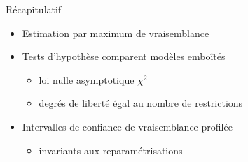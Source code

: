 \documentclass[
  ignorenonframetext,
]{beamer}
\providecommand{\tightlist}{%
  \setlength{\itemsep}{0pt}\setlength{\parskip}{0pt}}\usepackage{longtable,booktabs,array}
\begin{document}
\begin{frame}{Récapitulatif}
\protect\hypertarget{ruxe9capitulatif-2}{}
\begin{itemize}
\tightlist
\item
  Estimation par maximum de vraisemblance
\item
  Tests d'hypothèse comparent modèles emboîtés

  \begin{itemize}
  \tightlist
  \item
    loi nulle asymptotique \(\chi^2\)
  \item
    degrés de liberté égal au nombre de restrictions
  \end{itemize}
\item
  Intervalles de confiance de vraisemblance profilée

  \begin{itemize}
  \tightlist
  \item
    invariants aux reparamétrisations
  \end{itemize}
\end{itemize}
\end{frame}
\end{document}
